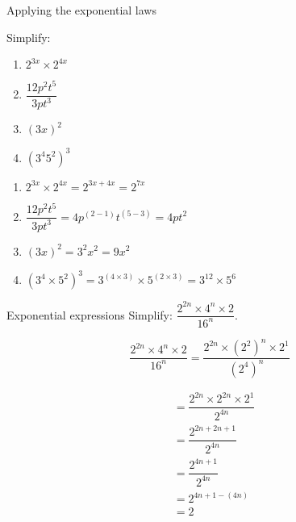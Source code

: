 % 
% 


\begin{wex}
{Applying the exponential laws}
{Simplify:
\begin{enumerate}[itemsep=6pt, label=\textbf{\arabic*}.]
\item $2^{3x} \times 2^{4x}$
\item $\dfrac{12p^2t^5}{3pt^3}$
\item $ (3x)^2 $
\item $(3^4 5^2)^3$
\end{enumerate}
}
{
\begin{enumerate}[itemsep=6pt, label=\textbf{\arabic*}.]
\item  $2^{3x} \times 2^{4x} = 2^{3x+4x} = 2^{7x}$
 \item $\dfrac{12p^2t^5}{3pt^3} = 4p^{(2-1)}t^{(5-3)} = 4pt^2$
 \item $ (3x)^2 = 3^2x^2 = 9x^2$
 \item $(3^4\times5^2)^3 = 3^{(4\times3)}\times5^{(2\times3)} = 3^{12}\times5^6 $
\end{enumerate}
}
\end{wex}

\begin{wex}
{Exponential expressions}
{Simplify: $\dfrac{2^{2n} \times 4^n \times 2}{16^n}$.}
{
\begin{equation*}
  \dfrac{2^{2n} \times 4^n \times 2}{16^n} = \dfrac{2^{2n} \times (2^2)^n \times 2^1}{(2^4)^n} 
\end{equation*}

\begin{align*}
  &= \dfrac{2^{2n} \times 2^{2n} \times 2^1}{2^{4n}} \\
  &= \dfrac{2^{2n + 2n +1}}{2^{4n}} \\
  &= \dfrac{2^{4n+1}}{2^{4n}} \\
  &= 2^{4n+1-(4n)} \\
  &= 2
\end{align*}
}
\end{wex}

